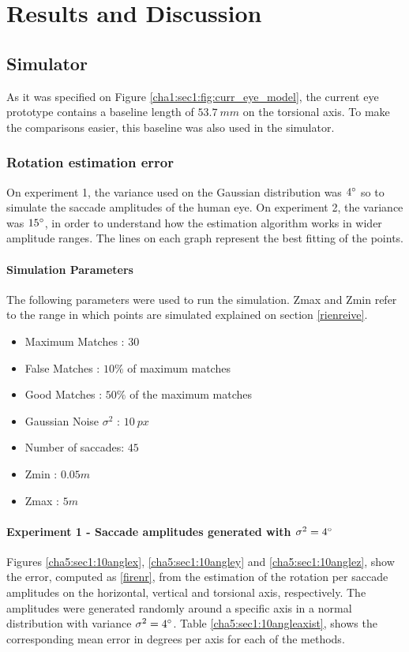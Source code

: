 
\chapter{Results and Discussion}
\label{cha4:results}

\section{Simulator}
As it was specified on Figure \ref{cha1:sec1:fig:curr_eye_model}, the current eye prototype contains a baseline length of $53.7 \ mm$ on the torsional axis. To make the comparisons easier, this baseline was also used in the simulator.
\subsection{Rotation estimation error}
\label{reiovniorevn}
On experiment 1, the variance used on the Gaussian distribution was $4 \degree$ so to simulate the saccade amplitudes of the human eye. On experiment 2, the variance was $15 \degree$, in order to understand how the estimation algorithm works in wider amplitude ranges.
The lines on each graph represent the best fitting of the points.
\subsubsection{Simulation Parameters}
The following parameters were used to run the simulation. Zmax and Zmin refer to the range in which points are simulated explained on section \ref{rienreive}.
\begin{itemize}
	\item Maximum Matches : $30$
	\item False Matches : $10 \%$ of maximum matches
	\item Good Matches : $50 \%$ of the maximum matches
	\item Gaussian Noise $\sigma^2$ : $10 \ px$
	\item Number of saccades: $45$
	\item Zmin : $0.05 m$
	\item Zmax : $5 m$
\end{itemize}
\subsubsection{Experiment 1 - Saccade amplitudes generated with $\sigma^2 = 4 \degree $}
Figures \ref{cha5:sec1:10anglex}, \ref{cha5:sec1:10angley} and \ref{cha5:sec1:10anglez}, show the error, computed as \ref{firenr}, from the estimation of the rotation per saccade amplitudes on the horizontal, vertical and torsional axis, respectively. The amplitudes were generated randomly around a specific axis in a normal distribution with variance $\sigma^2 = 4 \degree$. Table \ref{cha5:sec1:10angleaxist}, shows the corresponding mean error in degrees per axis for each of the methods.

